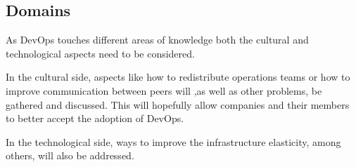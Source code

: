     	\subsection{Domains}
    
    	As DevOps touches different areas of knowledge both the cultural and technological aspects need to be considered. 
    
    	In the cultural side, aspects like how to redistribute operations teams or how to improve communication between peers will ,as well as other problems, be gathered and discussed. This will hopefully allow companies and their members to better accept the adoption of DevOps.
    
    	In the technological side, ways to improve the infrastructure elasticity, among others, will also be addressed.  


